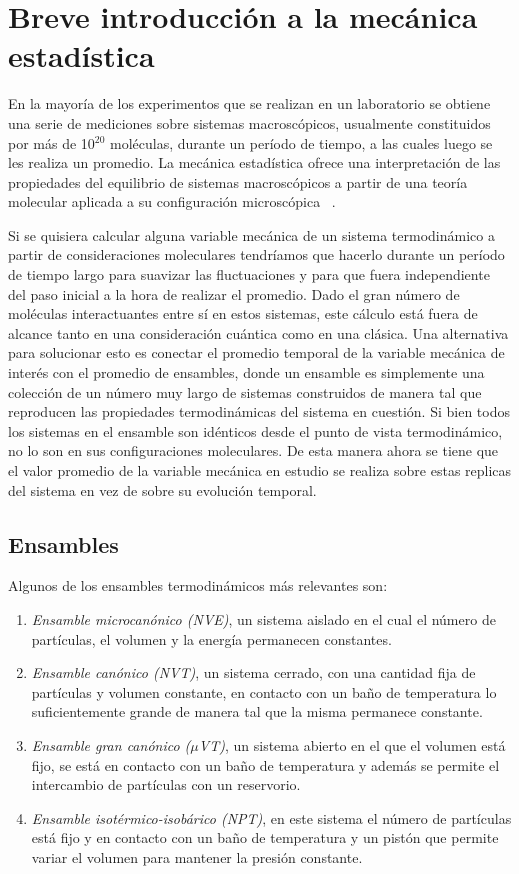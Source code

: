 \section{Breve introducción a la mecánica estadística}

En la mayoría de los experimentos que se realizan en un laboratorio se obtiene 
una serie de mediciones sobre sistemas macroscópicos, usualmente constituidos por 
más de 10$^{20}$ moléculas, durante un período de tiempo, a las cuales luego se 
les realiza un promedio. La mecánica estadística ofrece una interpretación de 
las propiedades del equilibrio de sistemas macroscópicos a partir de una teoría 
molecular aplicada a su configuración microscópica ~\cite{hill1986}.

Si se quisiera calcular alguna variable mecánica de un sistema termodinámico a
partir de consideraciones moleculares tendríamos que hacerlo durante un período
de tiempo largo para suavizar las fluctuaciones y para que fuera independiente
del paso inicial a la hora de realizar el promedio. Dado el gran número de 
moléculas interactuantes entre sí en estos sistemas, este cálculo está fuera de
alcance tanto en una consideración cuántica como en una clásica. Una alternativa
para solucionar esto es conectar el promedio temporal de la variable mecánica de
interés con el promedio de ensambles, donde un ensamble es simplemente una 
colección de un número muy largo de sistemas construidos de manera tal que 
reproducen las propiedades termodinámicas del sistema en cuestión. Si bien todos
los sistemas en el ensamble son idénticos desde el punto de vista termodinámico,
no lo son en sus configuraciones moleculares. De esta manera ahora se tiene
que el valor promedio de la variable mecánica en estudio se realiza sobre estas 
replicas del sistema en vez de sobre su evolución temporal.

\subsection{Ensambles}

Algunos de los ensambles termodinámicos más relevantes son:
\begin{enumerate}
    \item \textit{Ensamble microcanónico (NVE)}, un sistema aislado en el cual el 
        número de partículas, el volumen y la energía permanecen constantes.
    \item \textit{Ensamble canónico (NVT)}, un sistema cerrado, con una cantidad
        fija de partículas y volumen constante, en contacto con un baño de 
        temperatura lo suficientemente grande de manera tal que la misma permanece 
        constante.
    \item \textit{Ensamble gran canónico ($\mu$VT)}, un sistema abierto en el que
        el volumen está fijo, se está en contacto con un baño de temperatura y
        además se permite el intercambio de partículas con un reservorio.
    \item \textit{Ensamble isotérmico-isobárico (NPT)}, en este sistema el número
        de partículas está fijo y en contacto con un baño de temperatura y un
        pistón que permite variar el volumen para mantener la presión constante.
\end{enumerate}

